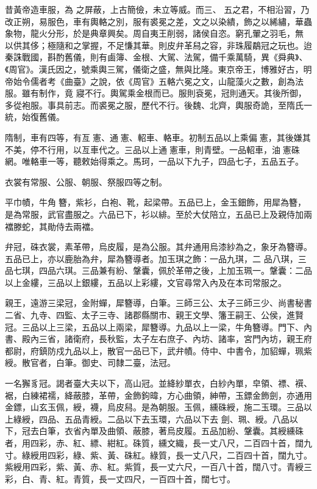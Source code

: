 
\begin{pinyinscope}

 昔黃帝造車服，為
 之屏蔽，上古簡儉，未立等威。而三、
 五之君，不相沿習，乃改正朔，易服色，車有輿輅之別，服有裘冕之差，文之以染繢，飾之以絺繡，華蟲象物，龍火分形，於是典章興矣。周自夷王削弱，諸侯自恣。窮孔翬之羽毛，無
 以供其侈；極隨和之掌握，不足慊其華。則皮弁革舄之容，非珠履鷸冠之玩也。迨秦誅戰國，斟酌舊儀，則有鹵簿、金根、大駕、法駕，備千乘萬騎，異《舜典》、《周官》。漢氏因之，號乘輿三駕，儀衛之盛，無與比隆。東京帝王，博雅好古，明帝始令儒者考《曲臺》之說，依《周官》五輅六冕之文，山龍藻火之數，創為法服。雖有制作，竟
 寢不行。輿駕乘金根而已。服則袞冕，冠則通天。其後所御，多從袍服。事具前志。而裘冕之服，歷代不行。後魏、北齊，輿服奇詭，至隋氏一統，始復舊儀。



 隋制，車有四等，有亙憲、通憲、軺車、輅車。初制五品以上乘偏憲，其後嫌其不美，停不行用，以亙車代之。三品以上通憲車，則青壁。一品軺車，油憲硃網。唯輅車一等，聽敕始得乘之。馬珂，一品以下九子，四品七子，五品五子。



 衣裳有常服、公服、朝服、祭服四等之制。



 平巾幘，牛角簪，紫衫，白袍、靴，起梁帶。五品已上，金玉鈿飾，用犀為簪，是為常服，武官盡服之。六品已下，衫以緋。至於大仗陪立，五品已上及親侍加兩襠滕蛇，其勛侍去兩襠。



 弁冠，硃衣裳，素革帶，烏皮履，是為公服。其弁通用烏漆紗為之，象牙為簪導。五品已上，亦以鹿胎為弁，犀為簪導者。加玉琪之飾：一品九琪，二
 品八琪，三品七琪，四品六琪。三品兼有紛、鞶囊，佩於革帶之後，上加玉珮一。鞶囊：二品以上金縷，三品以上銀縷，五品以上彩縷，文官尋常入內及在本司常服之。



 親王，遠游三梁冠，金附蟬，犀簪導，白筆。三師三公、太子三師三少、尚書秘書二省、九寺、四監、太子三寺、諸郡縣關市、親王文學、籓王嗣王、公侯，進賢冠。三品以上三梁，五品以上兩梁，犀簪導。九品以上一梁，牛角簪導。門下、內書、殿內三省，諸衛府，長秋監，太子左右庶子、內坊、諸率，宮門內坊，親王府都尉，府鎮防戍九品以上，散官一品已下，武弁幘。侍中、中書令，加貂蟬，珮紫綬。散官者，白筆。御史、司隸二臺，法冠。



 一名獬豸冠。謁者臺大夫以下，高山冠。並絳紗單衣，白紗內單，皁領、褾、襈、裾，白練裙襦，絳蔽膝，革帶，金飾鉤暐，方心曲領，紳帶，玉鏢金飾劍，亦通用金鏢，山玄玉佩，綬，襪，烏皮舄。是為朝服。玉佩，纁硃綬，施二玉環。三品以上綠綬，四品、五品青綬。二品以下去玉環，六品以下去
 劍、珮、綬。八品以下，冠去白筆，衣省內單及曲領、蔽膝，著烏皮履。五品加紛、鞶囊。其綬纁硃者，用四彩，赤、紅、縹、紺紅。硃質，纁文織，長一丈八尺，二百四十首，闊九寸。綠綬用四彩，綠、紫、黃、硃紅。綠質，長一丈八尺，二百四十首，闊九寸。紫綬用四彩，紫、黃、赤、紅。紫質，長一丈六尺，一百八十首，闊八寸。青綬三彩，白、青、紅。青質，長一丈四尺，一百四十首，闊七寸。




\end{pinyinscope}
